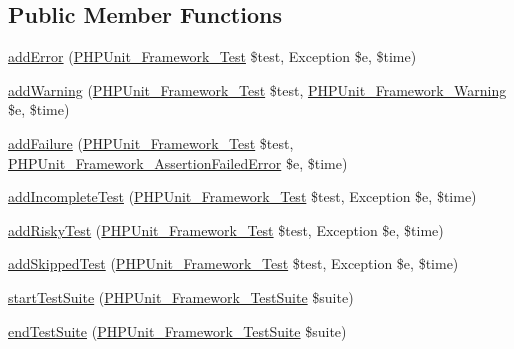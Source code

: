 \subsection*{Public Member Functions}
\begin{DoxyCompactItemize}
\item 
\mbox{\hyperlink{class_p_h_p_unit___util___log___j_s_o_n_a320d7bc7d2f9264ee7ba7aca6fd2df41}{add\+Error}} (\mbox{\hyperlink{interface_p_h_p_unit___framework___test}{P\+H\+P\+Unit\+\_\+\+Framework\+\_\+\+Test}} \$test, Exception \$e, \$time)
\item 
\mbox{\hyperlink{class_p_h_p_unit___util___log___j_s_o_n_a6c3d134992c5b03573561ef82e7f743d}{add\+Warning}} (\mbox{\hyperlink{interface_p_h_p_unit___framework___test}{P\+H\+P\+Unit\+\_\+\+Framework\+\_\+\+Test}} \$test, \mbox{\hyperlink{class_p_h_p_unit___framework___warning}{P\+H\+P\+Unit\+\_\+\+Framework\+\_\+\+Warning}} \$e, \$time)
\item 
\mbox{\hyperlink{class_p_h_p_unit___util___log___j_s_o_n_a668f17b68705c5c8686bac690a6f719d}{add\+Failure}} (\mbox{\hyperlink{interface_p_h_p_unit___framework___test}{P\+H\+P\+Unit\+\_\+\+Framework\+\_\+\+Test}} \$test, \mbox{\hyperlink{class_p_h_p_unit___framework___assertion_failed_error}{P\+H\+P\+Unit\+\_\+\+Framework\+\_\+\+Assertion\+Failed\+Error}} \$e, \$time)
\item 
\mbox{\hyperlink{class_p_h_p_unit___util___log___j_s_o_n_a81bfe09a62194fe5769ca1cc36ee428b}{add\+Incomplete\+Test}} (\mbox{\hyperlink{interface_p_h_p_unit___framework___test}{P\+H\+P\+Unit\+\_\+\+Framework\+\_\+\+Test}} \$test, Exception \$e, \$time)
\item 
\mbox{\hyperlink{class_p_h_p_unit___util___log___j_s_o_n_ad161e7d13b117cb0af3967cd2adc6bba}{add\+Risky\+Test}} (\mbox{\hyperlink{interface_p_h_p_unit___framework___test}{P\+H\+P\+Unit\+\_\+\+Framework\+\_\+\+Test}} \$test, Exception \$e, \$time)
\item 
\mbox{\hyperlink{class_p_h_p_unit___util___log___j_s_o_n_a1c0cb3bc58e5807530daf3a93783ed4e}{add\+Skipped\+Test}} (\mbox{\hyperlink{interface_p_h_p_unit___framework___test}{P\+H\+P\+Unit\+\_\+\+Framework\+\_\+\+Test}} \$test, Exception \$e, \$time)
\item 
\mbox{\hyperlink{class_p_h_p_unit___util___log___j_s_o_n_a901a86a623d83184267b21f2daee0ff5}{start\+Test\+Suite}} (\mbox{\hyperlink{class_p_h_p_unit___framework___test_suite}{P\+H\+P\+Unit\+\_\+\+Framework\+\_\+\+Test\+Suite}} \$suite)
\item 
\mbox{\hyperlink{class_p_h_p_unit___util___log___j_s_o_n_aeec28a4d1328434916ebcdc1ca6b5527}{end\+Test\+Suite}} (\mbox{\hyperlink{class_p_h_p_unit___framework___test_suite}{P\+H\+P\+Unit\+\_\+\+Framework\+\_\+\+Test\+Suite}} \$suite)

\end{DoxyCompactItemize}
